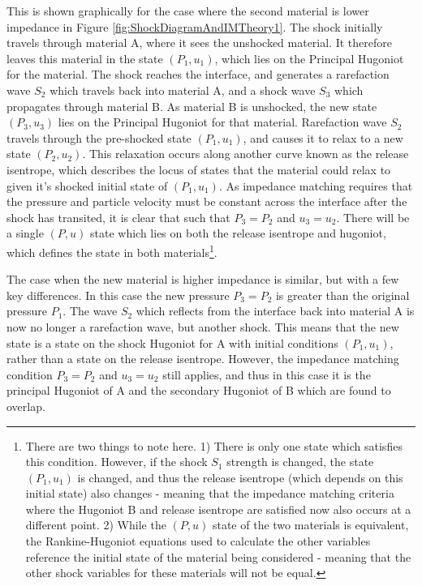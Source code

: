 This is shown graphically for the case where the second material is lower impedance in Figure \ref{fig:ShockDiagramAndIMTheory1}. The shock initially travels through material A, where it sees the unshocked material. It therefore leaves this material in the state $(P_1, u_1)$, which lies on the Principal Hugoniot for the material. The shock reaches the interface, and generates a rarefaction wave $S_2$ which travels back into material A, and a shock wave $S_3$ which propagates through material B. As material B is unshocked, the new state $(P_3, u_3)$ lies on the Principal Hugoniot for that material. Rarefaction wave $S_2$ travels through the pre-shocked state $(P_1, u_1)$, and causes it to relax to a new state $(P_2, u_2)$. This relaxation occurs along another curve known as the release isentrope, which describes the locus of states that the material could relax to given it's shocked initial state of $(P_1, u_1)$. As impedance matching requires that the pressure and particle velocity must be constant across the interface after the shock has transited, it is clear that such that $P_3 = P_2$ and $u_3 = u_2$. There will be a single $(P, u)$ state which lies on both the release isentrope and hugoniot, which defines the state in both materials\footnote{There are two things to note here. 1) There is only one state which satisfies this condition. However, if the shock $S_1$ strength is changed, the state $(P_1, u_1)$ is changed, and thus the release isentrope (which depends on this initial state) also changes - meaning that the impedance matching criteria where the Hugoniot B and release isentrope are satisfied now also occurs at a different point. 2) While the $(P,u)$ state of the two materials is equivalent, the Rankine-Hugoniot equations used to calculate the other variables reference the initial state of the material being considered - meaning that the other shock variables for these materials will not be equal.}.

The case when the new material is higher impedance is similar, but with a few key differences. In this case the new pressure $P_3 = P_2$ is greater than the original pressure $P_1$. The wave $S_2$ which reflects from the interface back into material A is now no longer a rarefaction wave, but another shock. This means that the new state is a state on the shock Hugoniot for A with initial conditions $(P_1, u_1)$, rather than a state on the release isentrope. However, the impedance matching condition $P_3 = P_2$ and $u_3 = u_2$ still applies, and thus in this case it is the principal Hugoniot of A and the secondary Hugoniot of B which are found to overlap.

